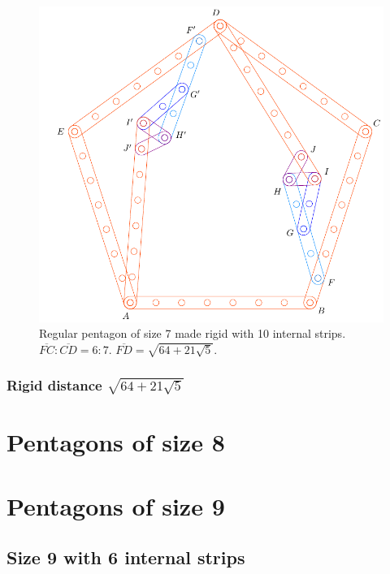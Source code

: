 \documentclass[11pt]{article}
\begin{document}
\begin{figure}[H]
\centering
\includegraphics[scale=0.7]{7/penta7-10a}
\caption{Regular pentagon of size 7 made rigid with 10 internal strips. $\overline{FC} : \overline{CD} = 6:7$. $\overline{FD} = \sqrt{64 + 21\sqrt5}$.}
\label{fig:penta6-10a}
\end{figure}

\subsubsection{Rigid distance $\sqrt{64 + 21\sqrt5}$}



\section{Pentagons of size 8}



\section{Pentagons of size 9}

\subsection{Size 9 with 6 internal strips}
\end{document}
